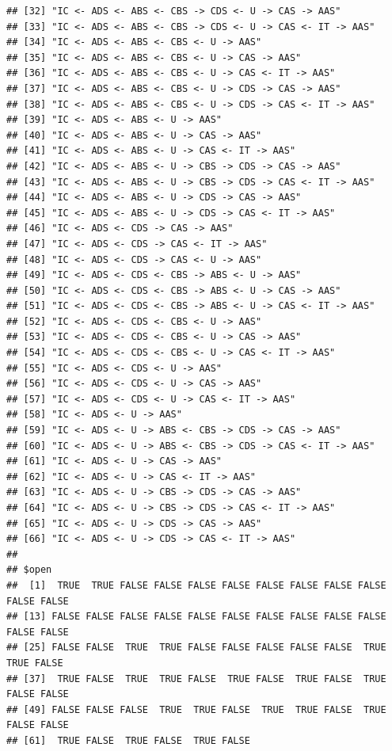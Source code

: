\documentclass[
  10pt,
  dvipsnames, enabledeprecatedfontcommands]{scrartcl}
\begin{document}
\begin{verbatim}
## [32] "IC <- ADS <- ABS <- CBS -> CDS <- U -> CAS -> AAS"      
## [33] "IC <- ADS <- ABS <- CBS -> CDS <- U -> CAS <- IT -> AAS"
## [34] "IC <- ADS <- ABS <- CBS <- U -> AAS"                    
## [35] "IC <- ADS <- ABS <- CBS <- U -> CAS -> AAS"             
## [36] "IC <- ADS <- ABS <- CBS <- U -> CAS <- IT -> AAS"       
## [37] "IC <- ADS <- ABS <- CBS <- U -> CDS -> CAS -> AAS"      
## [38] "IC <- ADS <- ABS <- CBS <- U -> CDS -> CAS <- IT -> AAS"
## [39] "IC <- ADS <- ABS <- U -> AAS"                           
## [40] "IC <- ADS <- ABS <- U -> CAS -> AAS"                    
## [41] "IC <- ADS <- ABS <- U -> CAS <- IT -> AAS"              
## [42] "IC <- ADS <- ABS <- U -> CBS -> CDS -> CAS -> AAS"      
## [43] "IC <- ADS <- ABS <- U -> CBS -> CDS -> CAS <- IT -> AAS"
## [44] "IC <- ADS <- ABS <- U -> CDS -> CAS -> AAS"             
## [45] "IC <- ADS <- ABS <- U -> CDS -> CAS <- IT -> AAS"       
## [46] "IC <- ADS <- CDS -> CAS -> AAS"                         
## [47] "IC <- ADS <- CDS -> CAS <- IT -> AAS"                   
## [48] "IC <- ADS <- CDS -> CAS <- U -> AAS"                    
## [49] "IC <- ADS <- CDS <- CBS -> ABS <- U -> AAS"             
## [50] "IC <- ADS <- CDS <- CBS -> ABS <- U -> CAS -> AAS"      
## [51] "IC <- ADS <- CDS <- CBS -> ABS <- U -> CAS <- IT -> AAS"
## [52] "IC <- ADS <- CDS <- CBS <- U -> AAS"                    
## [53] "IC <- ADS <- CDS <- CBS <- U -> CAS -> AAS"             
## [54] "IC <- ADS <- CDS <- CBS <- U -> CAS <- IT -> AAS"       
## [55] "IC <- ADS <- CDS <- U -> AAS"                           
## [56] "IC <- ADS <- CDS <- U -> CAS -> AAS"                    
## [57] "IC <- ADS <- CDS <- U -> CAS <- IT -> AAS"              
## [58] "IC <- ADS <- U -> AAS"                                  
## [59] "IC <- ADS <- U -> ABS <- CBS -> CDS -> CAS -> AAS"      
## [60] "IC <- ADS <- U -> ABS <- CBS -> CDS -> CAS <- IT -> AAS"
## [61] "IC <- ADS <- U -> CAS -> AAS"                           
## [62] "IC <- ADS <- U -> CAS <- IT -> AAS"                     
## [63] "IC <- ADS <- U -> CBS -> CDS -> CAS -> AAS"             
## [64] "IC <- ADS <- U -> CBS -> CDS -> CAS <- IT -> AAS"       
## [65] "IC <- ADS <- U -> CDS -> CAS -> AAS"                    
## [66] "IC <- ADS <- U -> CDS -> CAS <- IT -> AAS"              
## 
## $open
##  [1]  TRUE  TRUE FALSE FALSE FALSE FALSE FALSE FALSE FALSE FALSE FALSE FALSE
## [13] FALSE FALSE FALSE FALSE FALSE FALSE FALSE FALSE FALSE FALSE FALSE FALSE
## [25] FALSE FALSE  TRUE  TRUE FALSE FALSE FALSE FALSE FALSE  TRUE  TRUE FALSE
## [37]  TRUE FALSE  TRUE  TRUE FALSE  TRUE FALSE  TRUE FALSE  TRUE FALSE FALSE
## [49] FALSE FALSE FALSE  TRUE  TRUE FALSE  TRUE  TRUE FALSE  TRUE FALSE FALSE
## [61]  TRUE FALSE  TRUE FALSE  TRUE FALSE
\end{verbatim}
\end{document}
